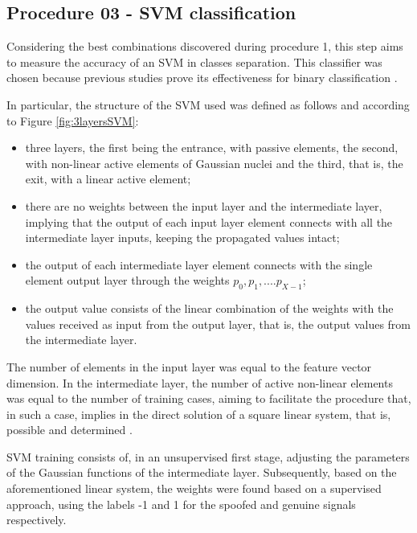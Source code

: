 		\subsection{Procedure 03 - SVM classification}
			\label{sec:propApproach:subsec:Experiment3}

			\par Considering the best combinations discovered during procedure 1, this step aims to measure the accuracy of an SVM in classes separation. This classifier was chosen because previous studies prove its effectiveness for binary classification \cite{bennett2000support}. 
			
			\par In particular, the structure of the SVM used was defined as follows and according to Figure \ref{fig:3layersSVM}: 
			\begin{itemize}
				\item three layers, the first being the entrance, with passive elements, the second, with non-linear active elements of Gaussian nuclei and the third, that is, the exit, with a linear active element;

				\item there are no weights between the input layer and the intermediate layer, implying that the output of each input layer element connects with all the intermediate layer inputs, keeping the propagated values intact;
				
				\item the output of each intermediate layer element connects with the single element output layer through the weights $p_0, p_1, .... p_{X-1}$;

				\item the output value consists of the linear combination of the weights with the values received as input from the output layer, that is, the output values from the intermediate layer.
			\end{itemize}
			
			
			
			\par The number of elements in the input layer was equal to the feature vector dimension. In the intermediate layer, the number of active non-linear elements was equal to the number of training cases, aiming to facilitate the procedure that, in such a case, implies in the direct solution of a square linear system, that is, possible and determined \cite{poole2014linear}. 
			
			\par SVM training consists of, in an unsupervised first stage, adjusting the parameters of the Gaussian functions of the intermediate layer. Subsequently, based on the aforementioned linear system, the weights were found based on a supervised approach, using the labels -1 and 1 for the spoofed and genuine signals respectively.   
			
